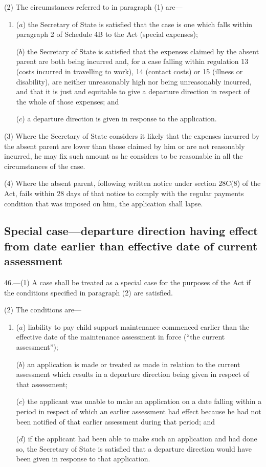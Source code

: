 \documentclass[a4paper]{article}
\begin{document}
(2) The circumstances referred to in paragraph (1) are—
\begin{enumerate}\item[]
($a$) the Secretary of State is satisfied that the case is one which falls within
paragraph 2 of Schedule 4B to the Act (special expenses);

($b$) the Secretary of State is satisfied that the expenses claimed by the absent
parent are both being incurred and, for a case falling within regulation 13
(costs incurred in travelling to work), 14 (contact costs) or 15 (illness or
disability), are neither unreasonably high nor being unreasonably incurred, and
that it is just and equitable to give a departure direction in respect of the
whole of those expenses; and

($c$) a departure direction is given in response to the application.
\end{enumerate}

(3) Where the Secretary of State considers it likely that the expenses incurred
by the absent parent are lower than those claimed by him or are not reasonably
incurred, he may fix such amount as he considers to be reasonable in all the
circumstances of the case.

(4) Where the absent parent, following written notice under section 28C(8) of
the Act, fails within 28 days of that notice to comply with the regular payments
condition that was imposed on him, the application shall lapse.

\subsection[46. Special case—departure direction having effect from date earlier than effective
date of current assessment]{Special case—departure direction having effect from date earlier than effective
date of current assessment}

46.—(1) A case shall be treated as a special case for
the purposes of the Act if the conditions specified in paragraph (2) are
satisfied.

(2) The conditions are—
\begin{enumerate}\item[]
($a$) liability to pay child support maintenance commenced earlier than the
effective date of the maintenance assessment in force (“the current
assessment”);

($b$) an application is made or treated as made in relation to the current
assessment which results in a departure direction being given in respect of that
assessment;

($c$) the applicant was unable to make an application on a date falling within a
period in respect of which an earlier assessment had effect because he had not
been notified of that earlier assessment during that period; and

($d$) if the applicant had been able to make such an application and had done so,
the Secretary of State is satisfied that a departure direction would have been
given in response to that application.
\end{enumerate}
\end{document}
